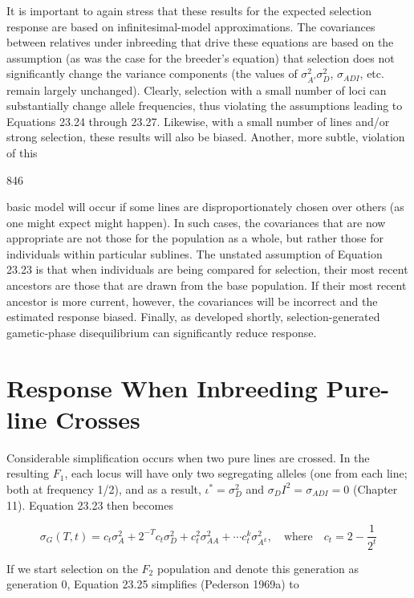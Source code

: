 \documentclass{article}
\begin{document}
It is important to again stress that these results for the expected selection response are based on infinitesimal-model approximations. The covariances between relatives under inbreeding that drive these equations are based on the assumption (as was the case for the breeder's equation) that selection does not significantly change the variance components (the values of  $ \sigma_{A'}^2 \sigma_D^2 $,  $ \sigma_{ADI} $, etc. remain largely unchanged). Clearly, selection with a small number of loci can substantially change allele frequencies, thus violating the assumptions leading to Equations 23.24 through 23.27. Likewise, with a small number of lines and/or strong selection, these results will also be biased. Another, more subtle, violation of this

846

basic model will occur if some lines are disproportionately chosen over others (as one might expect might happen). In such cases, the covariances that are now appropriate are not those for the population as a whole, but rather those for individuals within particular sublines. The unstated assumption of Equation 23.23 is that when individuals are being compared for selection, their most recent ancestors are those that are drawn from the base population. If their most recent ancestor is more current, however, the covariances will be incorrect and the estimated response biased. Finally, as developed shortly, selection-generated gametic-phase disequilibrium can significantly reduce response.

\section{Response When Inbreeding Pure-line Crosses}
Considerable simplification occurs when two pure lines are crossed. In the resulting  $ F_1 $, each locus will have only two segregating alleles (one from each line; both at frequency 1/2), and as a result,  $ \iota^* = \sigma_D^2 $ and  $ \sigma_DI^2 = \sigma_{ADI} = 0 $ (Chapter 11). Equation 23.23 then becomes

\begin{equation}
\sigma_{G}(T,t)=c_{t}\sigma_{A}^{2}+2^{-T}c_{t}\sigma_{D}^{2}+c_{t}^{2}\sigma_{A A}^{2}+\cdots c_{t}^{k}\sigma_{A^{k}}^{2},\quad\mathrm{w h e r e}\quad c_{t}=2-\frac{1}{2^{t}}
\tag{23.28}
\label{eq:23_28}
\end{equation}

If we start selection on the  $ F_{2} $ population and denote this generation as generation 0, Equation 23.25 simplifies (Pederson 1969a) to
\end{document}
